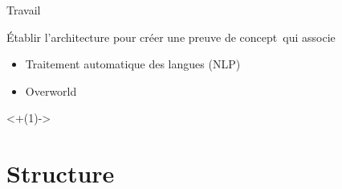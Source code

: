\documentclass[aspectratio=169]{audition-beamer}
\begin{document}
\begin{frame}{Travail}

  \vfill
  Établir l'architecture pour créer une preuve de concept\pause\ qui associe
  \begin{itemize}
    \item Traitement automatique des langues (NLP)
    \item Overworld
  \end{itemize}


  \onslide<+(1)->{\tableofcontents[subsectionstyle=hide/hide/hide]}

\end{frame}

\section{Structure}
\end{document}
